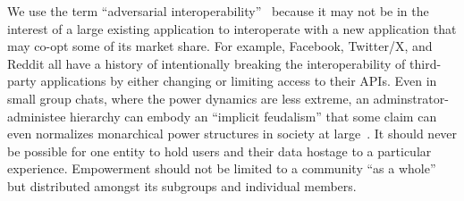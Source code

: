 
We use the term ``adversarial interoperability''~\cite{adversarialinterop} because it may not be in the
interest of a large existing application to interoperate with a new application that may co-opt some of its market share.
For example, Facebook, Twitter/X, and Reddit all have a history of intentionally breaking
the interoperability of third-party applications by either changing or limiting access to their APIs.
Even in small group chats, where the power dynamics are less extreme,
an adminstrator-administee hierarchy
can embody an ``implicit feudalism'' that some claim can even
normalizes monarchical power structures in society at large~\cite{governablespaces}.
It should never be possible for one entity to hold users
and their data hostage to a particular experience.
Empowerment should not be limited to a community ``as a whole'' but
distributed amongst its subgroups and individual members.









